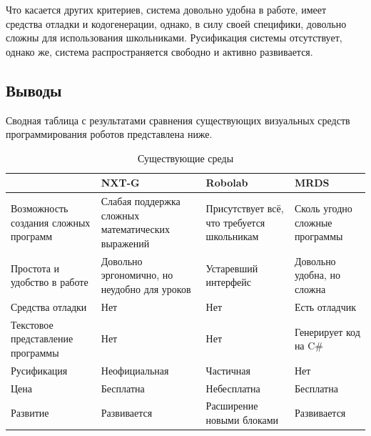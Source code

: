 \documentclass[a4paper]{article}
\begin{document}
Что касается других критериев, система довольно удобна в работе, имеет средства отладки и кодогенерации, однако, в силу своей специфики, довольно сложны для использования школьниками. Русификация системы отсутствует, однако же, система распространяется свободно и активно развивается.

\subsection{Выводы}
Сводная таблица с результатами сравнения существующих визуальных средств программирования роботов представлена ниже.

\begin{table}[h]
  \centering
    \begin{tabular} {| p{} | p{} | p{} | p{} |}
      \hline
                                            & NXT-G                                             & Robolab                                    & MRDS \\
      \hline
      Возможность создания сложных программ & Слабая поддержка сложных математических выражений & Присутствует всё, что требуется школьникам & Сколь угодно сложные программы \\
      \hline
      Простота и удобство в работе          & Довольно эргономично, но неудобно для уроков      & Устаревший интерфейс                       & Довольно удобна, но сложна \\
      \hline
      Средства отладки                      & Нет                                               & Нет                                        & Есть отладчик \\
      \hline
      Текстовое представление программы     & Нет                                               & Нет                                        & Генерирует код на C\# \\
      \hline
      Русификация                           & Неофициальная                                     & Частичная                                  & Нет \\
      \hline
      Цена                                  & Бесплатна                                         & Небесплатна                                & Бесплатна \\
      \hline
      Развитие                              & Развивается                                       & Расширение новыми блоками                  & Развивается \\
      \hline
    \end{tabular}
  \caption{Существующие среды}
  \label{tab:existingTools}
\end{table}
\end{document}
